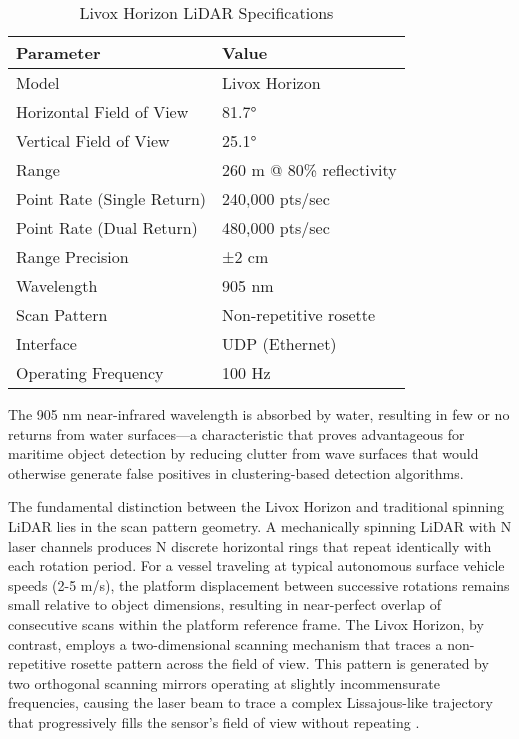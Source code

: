 \documentclass{erauthesis}
\begin{document}
\begin{table}[h]
\centering
\caption{Livox Horizon LiDAR Specifications}
\begin{tabular}{ll}
\hline
\textbf{Parameter} & \textbf{Value} \\
\hline
Model & Livox Horizon \\
Horizontal Field of View & 81.7° \\
Vertical Field of View & 25.1° \\
Range & 260 m @ 80\% reflectivity \\
Point Rate (Single Return) & 240,000 pts/sec \\
Point Rate (Dual Return) & 480,000 pts/sec \\
Range Precision & ±2 cm \\
Wavelength & 905 nm \\
Scan Pattern & Non-repetitive rosette \\
Interface & UDP (Ethernet) \\
Operating Frequency & 100 Hz \\
\hline
\end{tabular}
\label{tab:livox_horizon_specs}
\end{table}

The 905 nm near-infrared wavelength is absorbed by water, resulting in few or no returns from water surfaces—a characteristic that proves advantageous for maritime object detection by reducing clutter from wave surfaces that would otherwise generate false positives in clustering-based detection algorithms.

The fundamental distinction between the Livox Horizon and traditional spinning \ac{LiDAR} lies in the scan pattern geometry.
A mechanically spinning \ac{LiDAR} with N laser channels produces N discrete horizontal rings that repeat identically with each rotation period.
For a vessel traveling at typical autonomous surface vehicle speeds (2-5 m/s), the platform displacement between successive rotations remains small relative to object dimensions, resulting in near-perfect overlap of consecutive scans within the platform reference frame.
The Livox Horizon, by contrast, employs a two-dimensional scanning mechanism that traces a non-repetitive rosette pattern across the field of view.
This pattern is generated by two orthogonal scanning mirrors operating at slightly incommensurate frequencies, causing the laser beam to trace a complex Lissajous-like trajectory that progressively fills the sensor's field of view without repeating \cite{thompson2023}.
\end{document}
